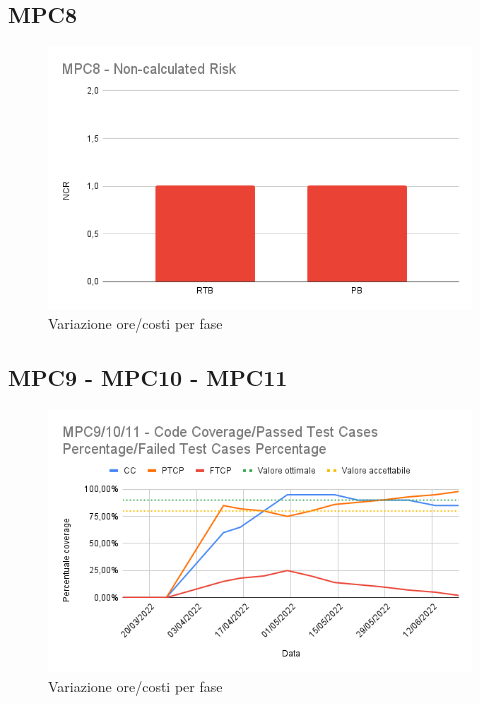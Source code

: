 \subsection{MPC8}
\begin{figure}[H]
    \centering
    \includegraphics[scale=0.65]{../../assets/MPC8 - Non-calculated Risk.png}
    \caption{Variazione ore/costi per fase}
\end{figure}
\newpage
\subsection{MPC9 - MPC10 - MPC11}
\begin{figure}[h!]
    \centering
    \includegraphics[scale=0.65]{../../assets/MPC9_10_11 - Code Coverage_Passed Test Cases Percentage_Failed Test Cases Percentage.png}
    \caption{Variazione ore/costi per fase}
\end{figure}

